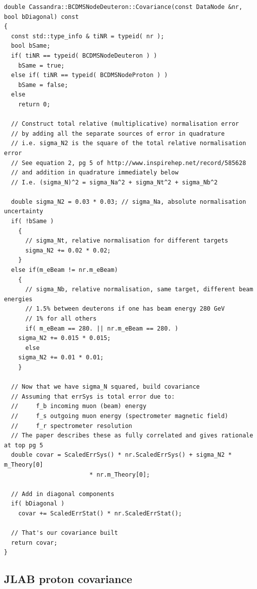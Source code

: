 \documentclass[12pt,a4paper]{report}
\begin{document}
\begin{Verbatim}[fontsize=\small]
double Cassandra::BCDMSNodeDeuteron::Covariance(const DataNode &nr, bool bDiagonal) const
{
  const std::type_info & tiNR = typeid( nr );
  bool bSame;
  if( tiNR == typeid( BCDMSNodeDeuteron ) )
    bSame = true;
  else if( tiNR == typeid( BCDMSNodeProton ) )
    bSame = false;
  else
    return 0;

  // Construct total relative (multiplicative) normalisation error
  // by adding all the separate sources of error in quadrature
  // i.e. sigma_N2 is the square of the total relative normalisation error
  // See equation 2, pg 5 of http://www.inspirehep.net/record/585628
  // and addition in quadrature immediately below
  // I.e. (sigma_N)^2 = sigma_Na^2 + sigma_Nt^2 + sigma_Nb^2

  double sigma_N2 = 0.03 * 0.03; // sigma_Na, absolute normalisation uncertainty
  if( !bSame )
    {
      // sigma_Nt, relative normalisation for different targets
      sigma_N2 += 0.02 * 0.02;
    }
  else if(m_eBeam != nr.m_eBeam)
    {
      // sigma_Nb, relative normalisation, same target, different beam energies
      // 1.5% between deuterons if one has beam energy 280 GeV
      // 1% for all others
      if( m_eBeam == 280. || nr.m_eBeam == 280. )
	sigma_N2 += 0.015 * 0.015;
      else
	sigma_N2 += 0.01 * 0.01;
    }

  // Now that we have sigma_N squared, build covariance
  // Assuming that errSys is total error due to:
  //     f_b incoming muon (beam) energy
  //     f_s outgoing muon energy (spectrometer magnetic field)
  //     f_r spectrometer resolution
  // The paper describes these as fully correlated and gives rationale at top pg 5
  double covar = ScaledErrSys() * nr.ScaledErrSys() + sigma_N2 * m_Theory[0]
                        * nr.m_Theory[0];

  // Add in diagonal components
  if( bDiagonal )
    covar += ScaledErrStat() * nr.ScaledErrStat();

  // That's our covariance built
  return covar;
}
\end{Verbatim}

\subsection{JLAB proton \cite{JLAB} covariance}
\end{document}
